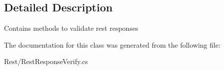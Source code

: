 \subsection{Detailed Description}
Contains methods to validate rest responses 



The documentation for this class was generated from the following file\-:\begin{DoxyCompactItemize}
\item 
Rest/Rest\-Response\-Verify.\-cs\end{DoxyCompactItemize}
